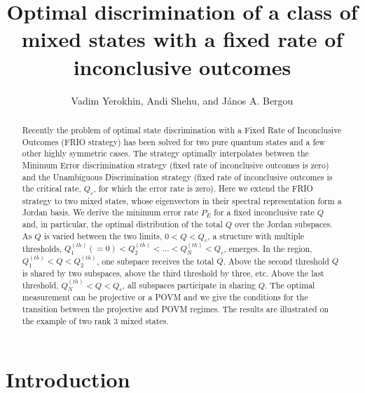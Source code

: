 \documentclass[aps,pra,twocolumn,eqsecnum,showpacs]{revtex4}
\begin{document}
  \title{Optimal discrimination of a class of mixed states with a fixed rate of inconclusive outcomes}
  \author{Vadim Yerokhin, Andi Shehu, and J\'{a}nos A. Bergou}

 
  
  \begin{abstract}
Recently the problem of optimal state discrimination with a Fixed Rate of Inconclusive Outcomes (FRIO strategy) has been solved for two pure quantum states and a few other highly symmetric cases. The strategy optimally interpolates between the Minimum Error discrimination strategy (fixed rate of inconclusive outcomes is zero) and the Unambiguous Discrimination strategy (fixed rate of inconclusive outcomes is the critical rate, $Q_{c}$, for which the error rate is zero). Here we extend the FRIO strategy to two mixed states, whose eigenvectors in their spectral representation form a Jordan basis. We derive the minimum error rate $P_{E}$ for a fixed inconclusive rate $Q$ and, in particular, the optimal distribution of the total $Q$ over the Jordan subspaces. As $Q$ is varied between the two limits, $0 < Q < Q_{c}$, a structure with multiple thresholds, $Q_{1}^{(th)} (=0) < Q_{2}^{(th)} < \ldots < Q_{N}^{(th)} < Q_{c}$, emerges. In the region, $Q_{1}^{(th)} < Q < Q_{2}^{(th)}$, one subspace receives the total $Q$. Above the second threshold $Q$ is shared by two subspaces, above the third threshold  by three, etc. Above the last threshold, $Q_{N}^{(th)} < Q < Q_{c}$, all subspaces participate in sharing $Q$.  The optimal measurement can be projective or a POVM and we give the conditions for the transition between the projective and POVM regimes.  The results are illustrated on the example of two rank 3 mixed states. 
 \end{abstract}
  \maketitle
  
  
\section{Introduction}
\label{Intro}
\end{document}
